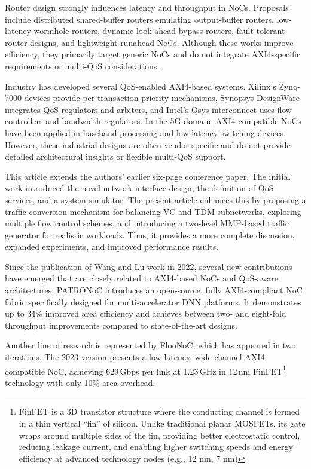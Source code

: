 Router design strongly influences latency and throughput in NoCs. Proposals include distributed shared-buffer routers emulating output-buffer routers, low-latency wormhole routers, dynamic look-ahead bypass routers, fault-tolerant router designs, and lightweight runahead NoCs. Although these works improve efficiency, they primarily target generic NoCs and do not integrate AXI4-specific requirements or multi-QoS considerations. 


Industry has developed several QoS-enabled AXI4-based systems. Xilinx’s Zynq-7000 devices provide per-transaction priority mechanisms, Synopsys DesignWare integrates QoS regulators and arbiters, and Intel’s Qsys interconnect uses flow controllers and bandwidth regulators. In the 5G domain, AXI4-compatible NoCs have been applied in baseband processing and low-latency switching devices. However, these industrial designs are often vendor-specific and do not provide detailed architectural insights or flexible multi-QoS support. 


This article extends the authors’ earlier six-page conference paper. The initial work introduced the novel network interface design, the definition of QoS services, and a system simulator. The present article enhances this by proposing a traffic conversion mechanism for balancing VC and TDM subnetworks, exploring multiple flow control schemes, and introducing a two-level MMP-based traffic generator for realistic workloads. Thus, it provides a more complete discussion, expanded experiments, and improved performance results. 


Since the publication of Wang and Lu work in 2022, several new contributions have emerged that are closely related to AXI4-based NoCs and QoS-aware architectures. PATRONoC introduces an open-source, fully AXI4-compliant NoC fabric specifically designed for multi-accelerator \ac{DNN} platforms. It demonstrates up to 34\% improved area efficiency and achieves between two- and eight-fold throughput improvements compared to state-of-the-art designs.\cite{jain_patronoc_2023} 

Another line of research is represented by FlooNoC, which has appeared in two iterations. The 2023 version presents a low-latency, wide-channel AXI4-compatible NoC, achieving 629\,Gbps per link at 1.23\,GHz in 12\,nm \ac{FinFET}\footnote{FinFET is a 3D transistor structure where the conducting channel is formed in a thin vertical “fin” of silicon. Unlike traditional planar MOSFETs, its gate wraps around multiple sides of the fin, providing better electrostatic control, reducing leakage current, and enabling higher switching speeds and energy efficiency at advanced technology nodes (e.g., 12 nm, 7 nm)} technology with only 10\% area overhead.\cite{fischer_floonoc_2023} 

